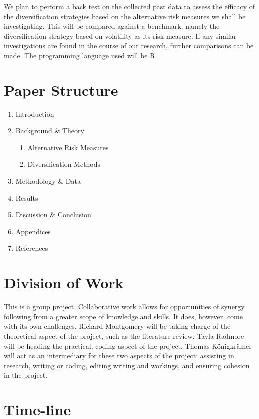 \documentclass[12pt,a4paper]{article}
\newcommand{\be}{\begin{enumerate}}
\newcommand{\ee}{\end{enumerate}}
\begin{document}
We plan to perform a back test on the collected past data to assess the efficacy of the diversification strategies based on the alternative risk measures we shall be investigating. This will be compared against a benchmark: namely the diversification strategy based on volatility as its risk measure. If any similar investigations are found in the course of our research, further comparisons can be made.  The programming language used will be R.

\section{Paper Structure}
\label{sec:struc}

\be
\item Introduction
\item Background \& Theory
	\be
	\item Alternative Risk Measures
	\item Diversification Methods
	\ee
\item Methodology \& Data
\item Results
\item Discussion \& Conclusion
\item Appendices %
\item References
\ee
 
\section{Division of Work}
\label{sec:dow} 

This is a group project. Collaborative work allows for opportunities of synergy following from a greater scope of knowledge and skills. It does, however, come with its own challenges. Richard Montgomery will be taking charge of the theoretical aspect of the project, such as the literature review. Tayla Radmore will be heading the practical, coding aspect of the project. Thomas K{\"o}nigkr{\"a}mer will act as an intermediary for these two aspects of the project: assisting in research, writing or coding, editing writing and workings, and ensuring cohesion in the project.

\section{Time-line}
\label{sec:time}
\end{document}
